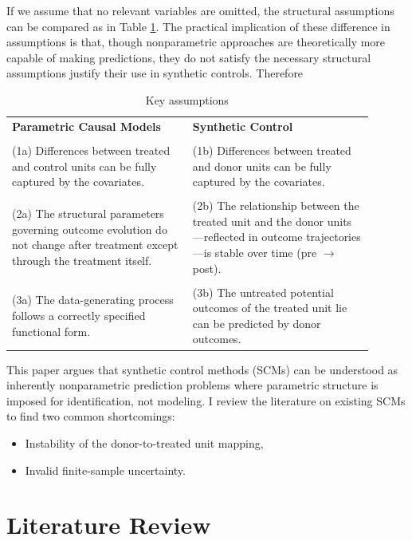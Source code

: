 \documentclass{article}
\begin{document}
If we assume that no relevant variables are omitted, the structural assumptions can be compared as in Table \ref{tableassumptions}. The practical implication of these difference in assumptions is that, though nonparametric approaches are theoretically more capable of making predictions, they do not satisfy the necessary structural assumptions justify their use in synthetic controls. Therefore

\begin{table}[h!]\label{tableassumptions}
\centering
\begin{tabular}{p{0.45\linewidth} | p{0.45\linewidth}}
\textbf{Parametric Causal Models} & \textbf{Synthetic Control} \\\\

(1a) Differences between treated and control units can be fully captured by the covariates.
& (1b) Differences between treated and donor units can be fully captured by the covariates. \\\\

(2a) The structural parameters governing outcome evolution do not change after treatment except through the treatment itself.
& (2b) The relationship between the treated unit and the donor units—reflected in outcome trajectories—is stable over time (pre $\rightarrow$ post). \\\\

(3a) The data-generating process follows a correctly specified functional form. 
& (3b) The untreated potential outcomes of the treated unit lie can be predicted by donor outcomes.
\end{tabular}
\caption{Key assumptions}
\end{table}

This paper argues that synthetic control methods (SCMs) can be understood as inherently nonparametric prediction problems where parametric structure is imposed for identification, not modeling. I review the literature on existing SCMs to find two common shortcomings:

\begin{itemize}
    \item Instability of the donor-to-treated unit mapping, 
    \item Invalid finite-sample uncertainty.    
\end{itemize}

\section{Literature Review}
\end{document}
